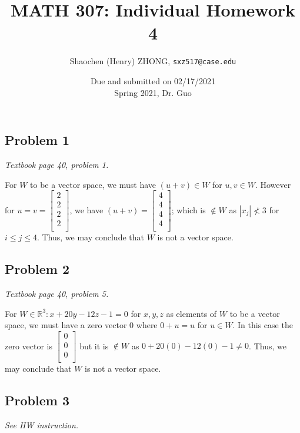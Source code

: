 \documentclass[11pt]{article}
\newcommand{\ilc}{\texttt}
\begin{document}
\title{\textbf{MATH 307: Individual Homework 4}}


\author{Shaochen (Henry) ZHONG, \ilc{sxz517@case.edu}}

\date{Due and submitted on 02/17/2021 \\ Spring 2021, Dr. Guo}
\maketitle

\subsection*{Problem 1}
\textit{Textbook page 40, problem 1.}\newline

For $W$ to be a vector space, we must have $(u + v) \in W$ for $u, v \in W$. However for $u = v = \begin{bmatrix} 2\\ 2\\ 2\\ 2\\\end{bmatrix}$, we have $(u + v) = \begin{bmatrix} 4\\ 4\\ 4\\ 4\\ \end{bmatrix}$; which is $\not\in W$ as $|x_j| \not< 3$ for $i \leq j \leq 4$. Thus, we may conclude that $W$ is not a vector space.


\subsection*{Problem 2}
\textit{Textbook page 40, problem 5.}\newline

For $W \in \mathbb{R}^3: x + 20y - 12z - 1 = 0$ for $x, y, z$ as elements of $W$ to be a vector space, we must have a zero vector $0$ where $0 + u = u$ for $u \in W$. In this case the zero vector is $\begin{bmatrix} 0\\ 0\\ 0\\ \end{bmatrix}$ but it is $\not \in W$ as $0 + 20(0) - 12(0) - 1 \neq 0$. Thus, we may conclude that $W$ is not a vector space.


\subsection*{Problem 3}
\textit{See HW instruction.}\newline
\end{document}
